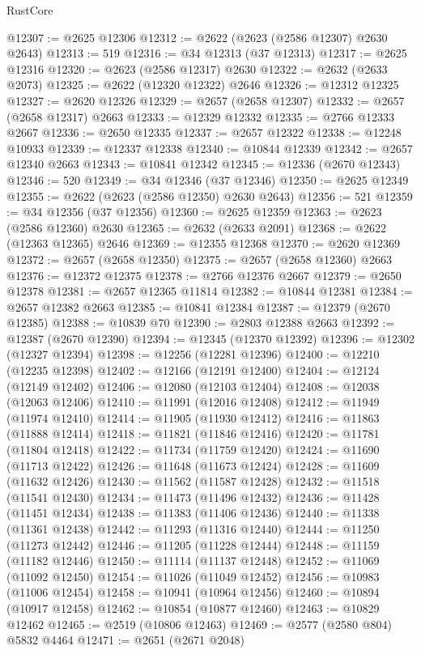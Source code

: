 \begin{lexlean}{RustCore}
\begin{coremodule}
@12307 := @2625 @12306
@12312 := @2622 (@2623 (@2586 @12307) @2630 @2643)
@12313 := 519
@12316 := @34 @12313 (@37 @12313)
@12317 := @2625 @12316
@12320 := @2623 (@2586 @12317) @2630
@12322 := @2632 (@2633 @2073)
@12325 := @2622 (@12320 @12322) @2646
@12326 := @12312 @12325
@12327 := @2620 @12326
@12329 := @2657 (@2658 @12307)
@12332 := @2657 (@2658 @12317) @2663
@12333 := @12329 @12332
@12335 := @2766 @12333 @2667
@12336 := @2650 @12335
@12337 := @2657 @12322
@12338 := @12248 @10933
@12339 := @12337 @12338
@12340 := @10844 @12339
@12342 := @2657 @12340 @2663
@12343 := @10841 @12342
@12345 := @12336 (@2670 @12343)
@12346 := 520
@12349 := @34 @12346 (@37 @12346)
@12350 := @2625 @12349
@12355 := @2622 (@2623 (@2586 @12350) @2630 @2643)
@12356 := 521
@12359 := @34 @12356 (@37 @12356)
@12360 := @2625 @12359
@12363 := @2623 (@2586 @12360) @2630
@12365 := @2632 (@2633 @2091)
@12368 := @2622 (@12363 @12365) @2646
@12369 := @12355 @12368
@12370 := @2620 @12369
@12372 := @2657 (@2658 @12350)
@12375 := @2657 (@2658 @12360) @2663
@12376 := @12372 @12375
@12378 := @2766 @12376 @2667
@12379 := @2650 @12378
@12381 := @2657 @12365 @11814
@12382 := @10844 @12381
@12384 := @2657 @12382 @2663
@12385 := @10841 @12384
@12387 := @12379 (@2670 @12385)
@12388 := @10839 @70
@12390 := @2803 @12388 @2663
@12392 := @12387 (@2670 @12390)
@12394 := @12345 (@12370 @12392)
@12396 := @12302 (@12327 @12394)
@12398 := @12256 (@12281 @12396)
@12400 := @12210 (@12235 @12398)
@12402 := @12166 (@12191 @12400)
@12404 := @12124 (@12149 @12402)
@12406 := @12080 (@12103 @12404)
@12408 := @12038 (@12063 @12406)
@12410 := @11991 (@12016 @12408)
@12412 := @11949 (@11974 @12410)
@12414 := @11905 (@11930 @12412)
@12416 := @11863 (@11888 @12414)
@12418 := @11821 (@11846 @12416)
@12420 := @11781 (@11804 @12418)
@12422 := @11734 (@11759 @12420)
@12424 := @11690 (@11713 @12422)
@12426 := @11648 (@11673 @12424)
@12428 := @11609 (@11632 @12426)
@12430 := @11562 (@11587 @12428)
@12432 := @11518 (@11541 @12430)
@12434 := @11473 (@11496 @12432)
@12436 := @11428 (@11451 @12434)
@12438 := @11383 (@11406 @12436)
@12440 := @11338 (@11361 @12438)
@12442 := @11293 (@11316 @12440)
@12444 := @11250 (@11273 @12442)
@12446 := @11205 (@11228 @12444)
@12448 := @11159 (@11182 @12446)
@12450 := @11114 (@11137 @12448)
@12452 := @11069 (@11092 @12450)
@12454 := @11026 (@11049 @12452)
@12456 := @10983 (@11006 @12454)
@12458 := @10941 (@10964 @12456)
@12460 := @10894 (@10917 @12458)
@12462 := @10854 (@10877 @12460)
@12463 := @10829 @12462
@12465 := @2519 (@10806 @12463)
@12469 := @2577 (@2580 @804) @5832 @4464
@12471 := @2651 (@2671 @2048)

\end{coremodule}
\end{lexlean}
